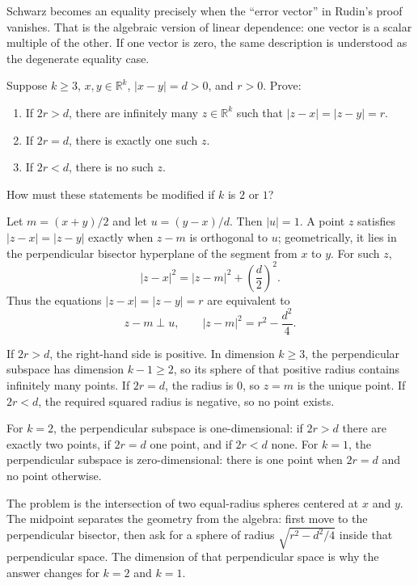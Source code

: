\documentclass[main.tex]{subfiles}
\begin{document}
\begin{Reflection}
Schwarz becomes an equality precisely when the ``error vector'' in Rudin's proof vanishes. That is
the algebraic version of linear dependence: one vector is a scalar multiple of the other. If one
vector is zero, the same description is understood as the degenerate equality case.
\end{Reflection}

Suppose $k\ge 3$, $x,y\in\mathbb R^k$, $|x-y|=d>0$, and $r>0$. Prove:
\begin{enumerate}[leftmargin=1.7em,itemsep=3pt,topsep=2pt,label=\textnormal{(\alph*)}]
  \item If $2r>d$, there are infinitely many $z\in\mathbb R^k$ such that
  $|z-x|=|z-y|=r$.
  \item If $2r=d$, there is exactly one such $z$.
  \item If $2r<d$, there is no such $z$.
\end{enumerate}
How must these statements be modified if $k$ is $2$ or $1$?

\begin{SolutionBlue}
Let $m=(x+y)/2$ and let $u=(y-x)/d$. Then $|u|=1$. A point $z$ satisfies
$|z-x|=|z-y|$ exactly when $z-m$ is orthogonal to $u$; geometrically, it lies in the perpendicular
bisector hyperplane of the segment from $x$ to $y$. For such $z$,
\[
|z-x|^2=|z-m|^2+\left(\frac d2\right)^2.
\]
Thus the equations $|z-x|=|z-y|=r$ are equivalent to
\[
z-m\perp u,\qquad |z-m|^2=r^2-\frac{d^2}{4}.
\]

If $2r>d$, the right-hand side is positive. In dimension $k\ge3$, the perpendicular subspace has
dimension $k-1\ge2$, so its sphere of that positive radius contains infinitely many points. If
$2r=d$, the radius is $0$, so $z=m$ is the unique point. If $2r<d$, the required squared radius is
negative, so no point exists.

For $k=2$, the perpendicular subspace is one-dimensional: if $2r>d$ there are exactly two points, if
$2r=d$ one point, and if $2r<d$ none. For $k=1$, the perpendicular subspace is zero-dimensional:
there is one point when $2r=d$ and no point otherwise.
\end{SolutionBlue}

\begin{Reflection}
The problem is the intersection of two equal-radius spheres centered at $x$ and $y$. The midpoint
separates the geometry from the algebra: first move to the perpendicular bisector, then ask for a
sphere of radius $\sqrt{r^2-d^2/4}$ inside that perpendicular space. The dimension of that
perpendicular space is why the answer changes for $k=2$ and $k=1$.
\end{Reflection}
\end{document}
